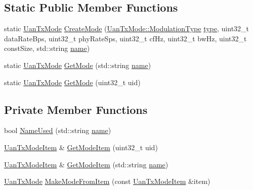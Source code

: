 \subsection*{Static Public Member Functions}
\begin{DoxyCompactItemize}
\item 
static \hyperlink{classns3_1_1UanTxMode}{Uan\+Tx\+Mode} \hyperlink{classns3_1_1UanTxModeFactory_a1dcaa49f3b408241596e49f860becfa2}{Create\+Mode} (\hyperlink{classns3_1_1UanTxMode_a0e822d222c13aa9499c96d9b3ad21223}{Uan\+Tx\+Mode\+::\+Modulation\+Type} \hyperlink{visualizer-ideas_8txt_add98db9e15e2a58cf2b57623e7aa893a}{type}, uint32\+\_\+t data\+Rate\+Bps, uint32\+\_\+t phy\+Rate\+Sps, uint32\+\_\+t cf\+Hz, uint32\+\_\+t bw\+Hz, uint32\+\_\+t const\+Size, std\+::string \hyperlink{generate__test__data__lte__spectrum__model_8m_ab74e6bf80237ddc4109968cedc58c151}{name})
\item 
static \hyperlink{classns3_1_1UanTxMode}{Uan\+Tx\+Mode} \hyperlink{classns3_1_1UanTxModeFactory_a44c034e34dcd300019877009e66bbf21}{Get\+Mode} (std\+::string \hyperlink{generate__test__data__lte__spectrum__model_8m_ab74e6bf80237ddc4109968cedc58c151}{name})
\item 
static \hyperlink{classns3_1_1UanTxMode}{Uan\+Tx\+Mode} \hyperlink{classns3_1_1UanTxModeFactory_a150e46af2ec1575965ba4060606208e0}{Get\+Mode} (uint32\+\_\+t uid)
\end{DoxyCompactItemize}
\subsection*{Private Member Functions}
\begin{DoxyCompactItemize}
\item 
bool \hyperlink{classns3_1_1UanTxModeFactory_aef5545d017936e97e4b317a478aae37d}{Name\+Used} (std\+::string \hyperlink{generate__test__data__lte__spectrum__model_8m_ab74e6bf80237ddc4109968cedc58c151}{name})
\item 
\hyperlink{structns3_1_1UanTxModeFactory_1_1UanTxModeItem}{Uan\+Tx\+Mode\+Item} \& \hyperlink{classns3_1_1UanTxModeFactory_afb272ecca21469db956cb5d1473472b6}{Get\+Mode\+Item} (uint32\+\_\+t uid)
\item 
\hyperlink{structns3_1_1UanTxModeFactory_1_1UanTxModeItem}{Uan\+Tx\+Mode\+Item} \& \hyperlink{classns3_1_1UanTxModeFactory_a5e20de7c2d7f4598d61b1760bf583220}{Get\+Mode\+Item} (std\+::string \hyperlink{generate__test__data__lte__spectrum__model_8m_ab74e6bf80237ddc4109968cedc58c151}{name})
\item 
\hyperlink{classns3_1_1UanTxMode}{Uan\+Tx\+Mode} \hyperlink{classns3_1_1UanTxModeFactory_a1ff3778acbea7c4d6e1f5e05f029eb5d}{Make\+Mode\+From\+Item} (const \hyperlink{structns3_1_1UanTxModeFactory_1_1UanTxModeItem}{Uan\+Tx\+Mode\+Item} \&item)
\end{DoxyCompactItemize}
